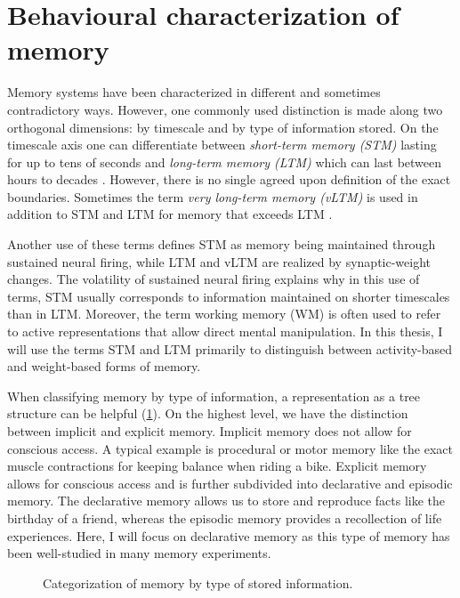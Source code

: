 \section{Behavioural characterization of memory}
Memory systems have been characterized in different and sometimes contradictory ways.
However, one commonly used distinction is made along two orthogonal dimensions:
by timescale and by type of information stored.
On the timescale axis one can differentiate between \emph{short-term memory (STM)} lasting for up to tens of seconds and \emph{long-term memory (LTM)} which can last between hours to decades \parencite{chaudhuri2016}.
However, there is no single agreed upon definition of the exact boundaries.
Sometimes the term \emph{very long-term memory (vLTM)} is used in addition to STM and LTM for memory that exceeds LTM \parencite{solso1998}.

Another use of these terms defines STM as memory being maintained through sustained neural firing, while LTM and vLTM are realized by synaptic-weight changes.
The volatility of sustained neural firing explains why in this use of terms, STM usually corresponds to information maintained on shorter timescales than in LTM\@.
Moreover, the term working memory (WM) is often used to refer to active representations that allow direct mental manipulation.
In this thesis, I will use the terms STM and LTM primarily to distinguish between activity-based and weight-based forms of memory.

When classifying memory by type of information, a representation as a tree structure can be helpful (\cref{fig:memtypes}).
On the highest level, we have the distinction between implicit and explicit memory.
Implicit memory does not allow for conscious access.
A typical example is procedural or motor memory like the exact muscle contractions for keeping balance when riding a bike.
Explicit memory allows for conscious access and is further subdivided into declarative and episodic memory.
The declarative memory allows us to store and reproduce facts like the birthday of a friend, whereas the episodic memory provides a recollection of life experiences.
Here, I will focus on declarative memory as this type of memory has been well-studied in many memory experiments.
\begin{figure}
    \centering
    \caption{Categorization of memory by type of stored 
        information.}\label{fig:memtypes}
\end{figure}


